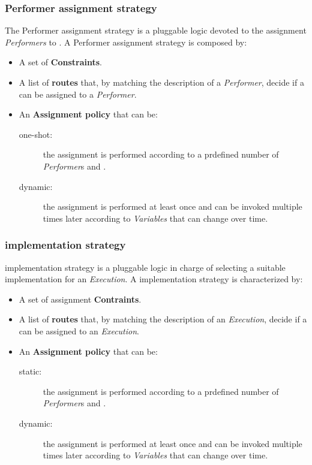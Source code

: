 \subsubsection{Performer assignment strategy}
The Performer assignment strategy is a pluggable logic devoted to the assignment
\emph{Performers} to \utask{}. A Performer assignment strategy is composed by:
\begin{itemize}
    \item A set of \textbf{Constraints}.

    \item A list of \textbf{routes} that, by matching the description of a
    \emph{Performer}, decide if a \utask{} can be assigned to a \emph{Performer}.

    \item An \textbf{Assignment policy} that can be:
        \begin{description}
            \item[one-shot:] the assignment is performed according to a prdefined
            number of \emph{Performer}s and \utask{}.
            \item[dynamic:] the assignment is performed at least once and can be
            invoked multiple times later according to \emph{Variables} that can
            change over time.
        \end{description}
\end{itemize}



\subsubsection{\utask{} implementation strategy}
\utask{} implementation strategy is a pluggable logic in charge of selecting a
suitable \utask{} implementation for an \emph{Execution}. A \utask{}
implementation strategy is characterized by:
\begin{itemize}
    \item A set of assignment \textbf{Contraints}.

    \item A list of \textbf{routes} that, by matching the description of an
    \emph{Execution}, decide if a \utask{} can be assigned to an \emph{Execution}.

    \item An \textbf{Assignment policy} that can be:
        \begin{description}
            \item[static:] the assignment is performed according to a prdefined
            number of \emph{Performer}s and \utask{}.
            \item[dynamic:] the assignment is performed at least once and can be
            invoked multiple times later according to \emph{Variables} that can
            change over time.
        \end{description}
\end{itemize}



